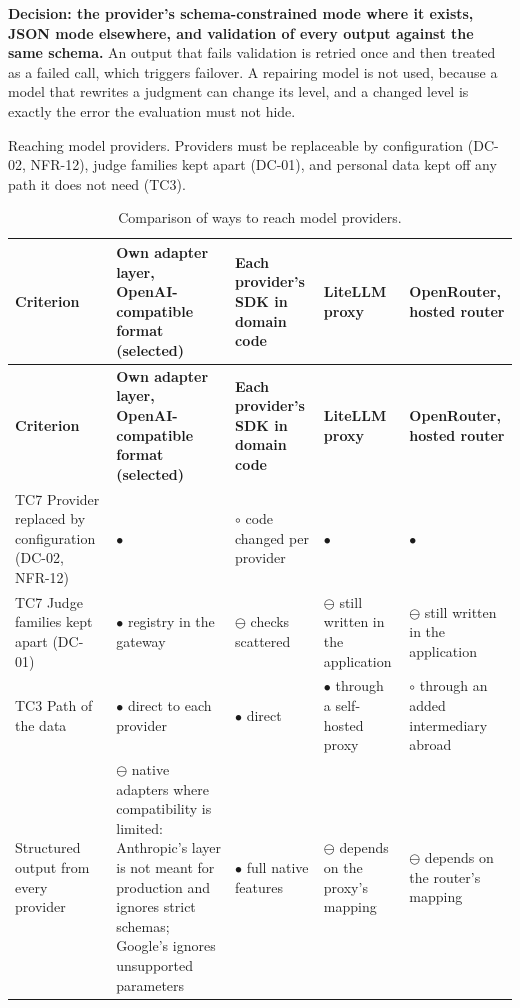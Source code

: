 \textbf{Decision: the provider's schema-constrained mode where it exists, JSON mode elsewhere, and validation of every output against the same schema.} An output that fails validation is retried once and then treated as a failed call, which triggers failover. A repairing model is not used, because a model that rewrites a judgment can change its level, and a changed level is exactly the error the evaluation must not hide.

Reaching model providers. Providers must be replaceable by configuration (DC-02, NFR-12), judge families kept apart (DC-01), and personal data kept off any path it does not need (TC3).

{\small
\begin{longtable}{|>{\raggedright\arraybackslash}p{}|>{\raggedright\arraybackslash}p{}|>{\raggedright\arraybackslash}p{}|>{\raggedright\arraybackslash}p{}|>{\raggedright\arraybackslash}p{}|}
\caption{Comparison of ways to reach model providers.} \\
\hline
\textbf{Criterion} & \textbf{Own adapter layer, OpenAI-compatible format (selected)} & \textbf{Each provider's SDK in domain code} & \textbf{LiteLLM proxy\cite{r191}} & \textbf{OpenRouter, hosted router\cite{r192}} \\ \hline
\endfirsthead
\hline
\textbf{Criterion} & \textbf{Own adapter layer, OpenAI-compatible format (selected)} & \textbf{Each provider's SDK in domain code} & \textbf{LiteLLM proxy\cite{r191}} & \textbf{OpenRouter, hosted router\cite{r192}} \\ \hline
\endhead
TC7 Provider replaced by configuration (DC-02, NFR-12) & $\bullet$ & $\circ$ code changed per provider & $\bullet$ & $\bullet$ \\ \hline
TC7 Judge families kept apart (DC-01) & $\bullet$ registry in the gateway & $\ominus$ checks scattered & $\ominus$ still written in the application & $\ominus$ still written in the application \\ \hline
TC3 Path of the data & $\bullet$ direct to each provider & $\bullet$ direct & $\bullet$ through a self-hosted proxy & $\circ$ through an added intermediary abroad \\ \hline
Structured output from every provider & $\ominus$ native adapters where compatibility is limited: Anthropic's layer is not meant for production and ignores strict schemas\cite{r195}; Google's ignores unsupported parameters\cite{r196} & $\bullet$ full native features & $\ominus$ depends on the proxy's mapping & $\ominus$ depends on the router's mapping \\ \hline

\end{longtable}}
